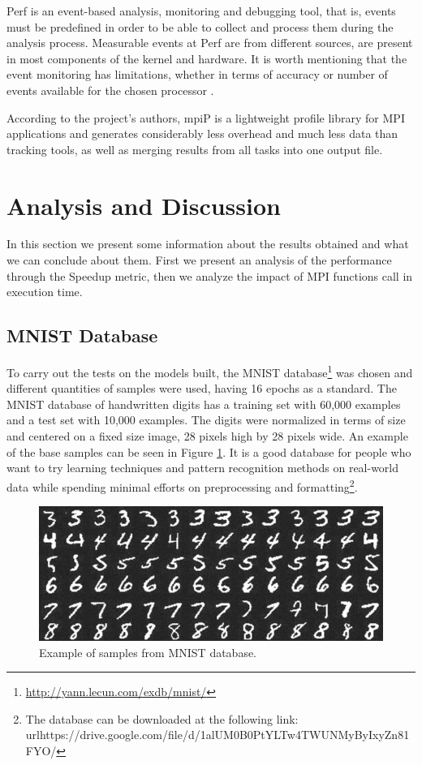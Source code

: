 \documentclass[conference]{IEEEtran}
\begin{document}
Perf is an event-based analysis, monitoring and debugging tool, that is, events must be predefined in order to be able to collect and process them during the analysis process. Measurable events at Perf are from different sources, are present in most components of the kernel and hardware. It is worth mentioning that the event monitoring has limitations, whether in terms of accuracy or number of events available for the chosen processor \cite{weaver2013linux}.

According to the project's authors, mpiP is a lightweight profile library for MPI applications and generates considerably less overhead and much less data than tracking tools, as well as merging results from all tasks into one output file.

\section{Analysis and Discussion}\label{sec:analysis}

In this section we present some information about the results obtained and what we can conclude about them. First we present an analysis of the performance through the Speedup metric, then we analyze the impact of MPI functions call in execution time.

\subsection{MNIST Database}\label{subsec:test}
To carry out the tests on the models built, the MNIST database\footnote{\url{http://yann.lecun.com/exdb/mnist/}} was chosen and different quantities of samples were used, having 16 epochs as a standard. The MNIST database of handwritten digits has a training set with 60,000 examples and a test set with 10,000 examples. The digits were normalized in terms of size and centered on a fixed size image, 28 pixels high by 28 pixels wide. An example of the base samples can be seen in Figure \ref{fig:mnist}. It is a good database for people who want to try learning techniques and pattern recognition methods on real-world data while spending minimal efforts on preprocessing and formatting\footnote{The database can be downloaded at the following link: url{https://drive.google.com/file/d/1alUM0B0PtYLTw4TWUNMyByIxyZn81FYO/}}.

\begin{figure}[H]
    \centering
    \includegraphics[width=\columnwidth]{images/mnist-example.png}
    \caption{Example of samples from MNIST database.}
    \label{fig:mnist}
\end{figure}
\end{document}
